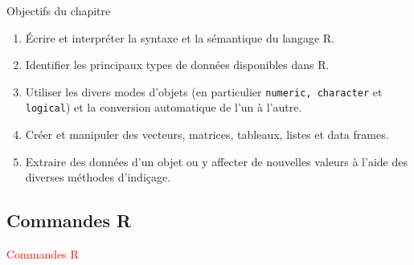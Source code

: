 \documentclass[11pt]{beamer}\usepackage[]{graphicx}\usepackage[]{color}
\newcommand{\code}[1]{\texttt{#1}}
\begin{document}
\begin{frame}[plain]
\hspace*{-1.0cm}\parbox[t]{\textwidth}{
\begin{block}{Objectifs du chapitre}
\begin{enumerate}
\item \'{E}crire et interpr\'{e}ter la syntaxe et la s\'{e}mantique du langage R.
\item Identifier les principaux types de donn\'{e}es disponibles dans R.
\item Utiliser les divers modes d’objets (en particulier \code{numeric, character} et \code{logical}) et la conversion automatique de l'un \`{a} l'autre.
\item Cr\'{e}er et manipuler des vecteurs, matrices, tableaux, listes et data frames.
\item Extraire des donn\'{e}es d'un objet ou y affecter de nouvelles valeurs \`{a} l'aide des diverses m\'{e}thodes d'indi\c{c}age.
\end{enumerate}
\end{block}
}
\end{frame}




\subsection{Commandes R}

\begin{frame}
 \begin{center}
  \Huge{\textcolor{red}{Commandes R}}
 \end{center}
\end{frame}
\end{document}
